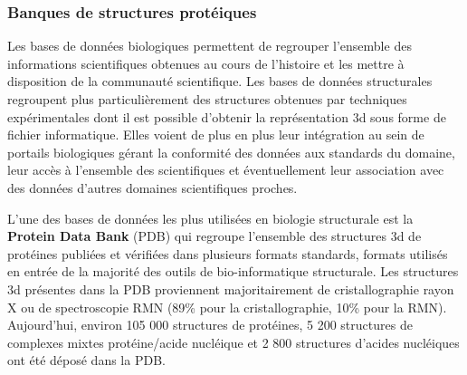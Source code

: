 \subsubsection{Banques de structures protéiques} \label{protein_DB}

Les bases de données biologiques permettent de regrouper l'ensemble des informations scientifiques obtenues au cours de l'histoire et les mettre à disposition de la communauté scientifique. Les bases de données structurales regroupent plus particulièrement des structures obtenues par techniques expérimentales dont il est possible d'obtenir la représentation 3d sous forme de fichier informatique. 
Elles voient de plus en plus leur intégration au sein de portails biologiques gérant la conformité des données aux standards du domaine, leur accès à l'ensemble des scientifiques et éventuellement leur association avec des données d'autres domaines scientifiques proches.

L'une des bases de données les plus utilisées en biologie structurale est la \textbf{Protein Data Bank} (PDB) \cite{berman_protein_2000} qui regroupe l'ensemble des structures 3d de protéines publiées et vérifiées dans plusieurs formats standards, formats utilisés en entrée de la majorité des outils de bio-informatique structurale. Les structures 3d présentes dans la PDB proviennent majoritairement de cristallographie rayon X ou de spectroscopie RMN (89\% pour la cristallographie, 10\% pour la RMN). Aujourd'hui, environ 105 000 structures de protéines, 5 200 structures de complexes mixtes protéine/acide nucléique et 2 800 structures d'acides nucléiques ont été déposé dans la PDB.

